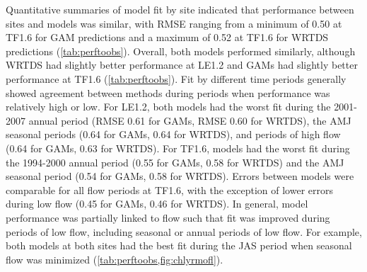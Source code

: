 \documentclass[letterpaper,12pt,oneside]{article}\usepackage[]{graphicx}\usepackage[]{color}
\begin{document}
Quantitative summaries of model fit by site indicated that performance between sites and models was similar, with \ac{RMSE} ranging from a minimum of 0.50 at TF1.6 for \ac{GAM} predictions and a maximum of 0.52 at TF1.6 for \ac{WRTDS} predictions (\cref{tab:perftoobs}).  Overall, both models performed similarly, although \ac{WRTDS} had slightly better performance at LE1.2 and \acp{GAM} had slightly better performance at TF1.6 (\cref{tab:perftoobs}).  Fit by different time periods generally showed agreement between methods during periods when performance was relatively high or low.  For LE1.2, both models had the worst fit during the 2001-2007 annual period (\ac{RMSE} 0.61 for \acp{GAM}, \ac{RMSE} 0.60 for \ac{WRTDS}), the \ac{AMJ} seasonal periods (0.64 for \acp{GAM}, 0.64 for \ac{WRTDS}), and periods of high flow (0.64 for \acp{GAM}, 0.63 for \ac{WRTDS}).  For TF1.6, models had the worst fit during the 1994-2000 annual period (0.55 for \acp{GAM}, 0.58 for \ac{WRTDS}) and the \ac{AMJ} seasonal period (0.54 for \acp{GAM}, 0.58 for \ac{WRTDS}).  Errors between models were comparable for all flow periods at TF1.6, with the exception of lower errors during low flow (0.45 for \acp{GAM}, 0.46 for \ac{WRTDS}).  In general, model performance was partially linked to flow such that fit was improved during periods of low flow, including seasonal or annual periods of low flow.  For example, both models at both sites had the best fit during the \ac{JAS} period when seasonal flow was minimized (\cref{tab:perftoobs,fig:chlyrmofl}).
\end{document}

